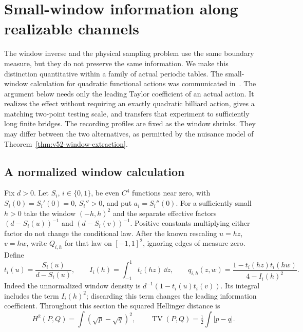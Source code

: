 \section{Small-window information along realizable channels}
\label{sec:v53-window-information}

The window inverse and the physical sampling problem use the same boundary
measure, but they do not preserve the same information.  We make this
distinction quantitative within a family of actual periodic tables.  The
small-window calculation for quadratic functional actions was communicated
in~\cite{A2ReviewV52}.  The argument below needs only the leading Taylor
coefficient of an actual action.  It realizes the effect without requiring
an exactly quadratic billiard action, gives a matching two-point testing
scale, and transfers that experiment to sufficiently long finite bridges.
The recording profiles are fixed as the window shrinks.  They may differ
between the two alternatives, as permitted by the nuisance model of
Theorem~\ref{thm:v52-window-extraction}.

\subsection{A normalized window calculation}

Fix $d>0$.  Let $S_i$, $i\in\{0,1\}$, be even $C^4$ functions near
zero, with $S_i(0)=S_i'(0)=0$, $S_i''>0$, and put $a_i=S_i''(0)$.
For a sufficiently small $h>0$ take the window $(-h,h)^2$ and the
separate effective factors $(d-S_i(u))^{-1}$ and $(d-S_i(v))^{-1}$.
Positive constants multiplying either factor do not change the conditional
law.  After the known rescaling $u=hz$, $v=hw$, write $Q_{i,h}$ for
that law on $[-1,1]^2$, ignoring edges of measure zero.  Define
\begin{equation}\label{eq:v53-q}
 t_i(u)=\frac{S_i(u)}{d-S_i(u)},\qquad
 I_i(h)=\int_{-1}^1t_i(hz)\,\dd z,\qquad
 q_{i,h}(z,w)=\frac{1-t_i(hz)t_i(hw)}{4-I_i(h)^2}.
\end{equation}
Indeed the unnormalized window density is
$d^{-1}(1-t_i(u)t_i(v))$.  Its integral includes the term $I_i(h)^2$;
discarding this term changes the leading information coefficient.
Throughout this section the squared Hellinger distance is
\[
 H^2(P,Q)=\int(\sqrt p-\sqrt q)^2,
 \qquad \operatorname{TV}(P,Q)=\tfrac12\int|p-q|.
\]

